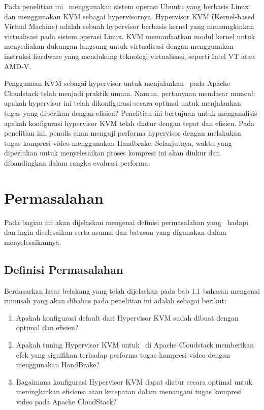 Pada penelitian ini \saya\ menggunakan sistem operasi Ubuntu yang berbasis Linux dan menggunakan KVM sebagai hypervisornya. Hypervisor KVM \f{(Kernel-based Virtual Machine)} adalah sebuah hypervisor berbasis kernel yang memungkinkan virtualisasi pada sistem operasi Linux\cite{whatiskvm}. KVM memanfaatkan modul kernel untuk menyediakan dukungan langsung untuk virtualisasi dengan menggunakan instruksi \f{hardware} yang mendukung teknologi virtualisasi, seperti Intel VT atau AMD-V.

Penggunaan KVM sebagai hypervisor untuk menjalankan \vm\ pada Apache Cloudstack telah menjadi praktik umum. Namun, pertanyaan mendasar muncul: apakah hypervisor ini telah dikonfigurasi secara optimal untuk menjalankan tugas yang diberikan dengan efisien? Penelitian ini bertujuan untuk menganalisis apakah konfigurasi hypervisor KVM telah diatur dengan tepat dan efisien. Pada penelitian ini, penulis akan menguji performa hypervisor dengan melakukan tugas kompresi video menggunakan Handbrake. Selanjutnya, waktu yang diperlukan untuk menyelesaikan proses kompresi ini akan diukur dan dibandingkan dalam rangka evaluasi performa.


\section{Permasalahan}
Pada bagian ini akan dijelaskan mengenai definisi permasalahan yang \saya~hadapi dan ingin diselesaikan serta asumsi dan batasan yang digunakan dalam menyelesaikannya.


\subsection{Definisi Permasalahan}
Berdasarkan latar belakang yang telah dijelaskan pada bab 1.1 bahasan mengenai rumusah yang akan dibahas pada penelitian ini adalah sebagai berikut:
\begin{enumerate}
  \item Apakah konfigurasi default dari Hypervisor KVM sudah dibuat dengan optimal dan efisien?
  \item Apakah tuning Hypervisor KVM untuk \vm\ di Apache Cloudstack memberikan efek yang signifikan terhadap performa tugas kompresi video dengan menggunakan HandBrake?
  \item Bagaimana konfigurasi Hypervisor KVM dapat diatur secara optimal untuk meningkatkan efisiensi atau kecepatan dalam menangani tugas kompresi video pada Apache CloudStack?
  
\end{enumerate}

